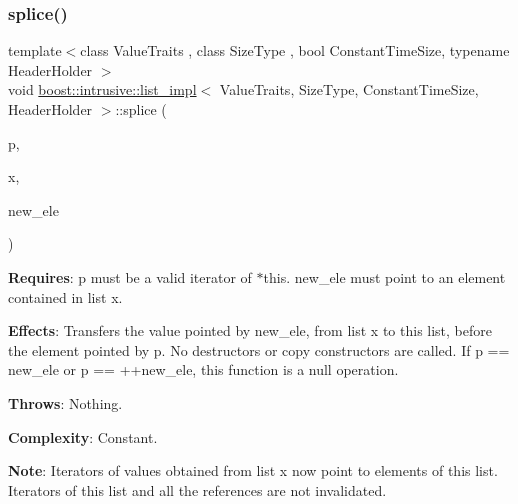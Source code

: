 \subsubsection{\texorpdfstring{splice()}{splice()}\hspace{0.1cm}{\footnotesize\ttfamily [2/4]}}
{\footnotesize\ttfamily template$<$class Value\+Traits , class Size\+Type , bool Constant\+Time\+Size, typename Header\+Holder $>$ \\
void \hyperlink{classboost_1_1intrusive_1_1list__impl}{boost\+::intrusive\+::list\+\_\+impl}$<$ Value\+Traits, Size\+Type, Constant\+Time\+Size, Header\+Holder $>$\+::splice (\begin{DoxyParamCaption}\item[{\hyperlink{classboost_1_1intrusive_1_1list__impl_af4ced710fe02662c5650d161af83d8cd}{const\+\_\+iterator}}]{p,  }\item[{\hyperlink{classboost_1_1intrusive_1_1list__impl}{list\+\_\+impl}$<$ Value\+Traits, Size\+Type, Constant\+Time\+Size, Header\+Holder $>$ \&}]{x,  }\item[{\hyperlink{classboost_1_1intrusive_1_1list__impl_af4ced710fe02662c5650d161af83d8cd}{const\+\_\+iterator}}]{new\+\_\+ele }\end{DoxyParamCaption})\hspace{0.3cm}{\ttfamily [inline]}}

{\bfseries Requires}\+: p must be a valid iterator of $\ast$this. new\+\_\+ele must point to an element contained in list x.

{\bfseries Effects}\+: Transfers the value pointed by new\+\_\+ele, from list x to this list, before the element pointed by p. No destructors or copy constructors are called. If p == new\+\_\+ele or p == ++new\+\_\+ele, this function is a null operation.

{\bfseries Throws}\+: Nothing.

{\bfseries Complexity}\+: Constant.

{\bfseries Note}\+: Iterators of values obtained from list x now point to elements of this list. Iterators of this list and all the references are not invalidated. \mbox{\label{classboost_1_1intrusive_1_1list__impl_aca408f75788b574272d29392aebef9a5}} 

